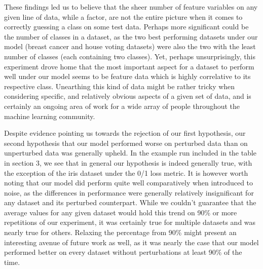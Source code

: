 \documentclass[twoside,11pt]{article}
\begin{document}
These findings led us to believe that the sheer number of feature variables on any given line of data, while a factor, are not the entire picture when it comes to correctly guessing a class on some test data.
Perhaps more significant could be the number of classes in a dataset, as the two best performing datasets under our model (breast cancer and house voting datasets) were also the two with the least number of 
classes (each containing two classes). Yet, perhaps unsurprisingly, this experiment drove home that the most important aspect for a dataset to perform well under our model seems to be feature data which is 
highly correlative to its  respective class. Unearthing this kind of data might be rather tricky when considering specific, and relatively obvious aspects of a given set of data, and is certainly an ongoing area of 
work for a wide array of people throughout the machine learning community.

Despite evidence pointing us towards the rejection of our first hypothesis, our second hypothesis that our model performed worse on perturbed data than on unperturbed data was generally upheld. In 
the example run included in the table in section 3, we see that in general our hypothesis is indeed generally true, with the exception of the iris dataset under the 0/1 loss metric. It is however worth noting
that our model did perform quite well comparatively when introduced to noise, as the differences in performance were generally relatively insignificant for any dataset and its perturbed counterpart. While we 
couldn't guarantee that the average values for any given dataset would hold this trend on 90\% or more repetitions of our experiment, it was certainly true for multiple datasets and was nearly true for others.
Relaxing the percentage from 90\% might present an interesting avenue of future work as well, as it was nearly the case that our model performed better on every dataset without perturbations at least 90\% of
the time.
\end{document}
